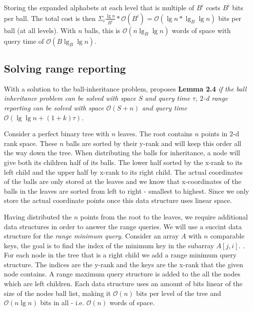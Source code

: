 Storing the expanded alphabets at each level that is multiple of $B^i$ costs $B^i$ bits per ball. The total cost is then $\Sigma_i \frac{\lg n}{B^i} * \mathcal{O}(B^i) = \mathcal{O}(\lg n * \lg_B \lg n)$ bits per ball (at all levels). With $n$ balls, this is $\mathcal{O}(n \lg_B \lg n)$ words of space with query time of $\mathcal{O}(B \lg_B \lg n)$. 


\subsection{Solving range reporting}
With a solution to the ball-inheritance problem, \citet{chanetal} proposes \textbf{Lemma 2.4} \emph{if the ball inheritance problem can be solved with space $S$ and query time $\tau$, $2$-d range reporting can be solved with space $\mathcal{O}(S+n)$ and query time $\mathcal{O}(\lg \lg n + (1+k) \tau)$.}

Consider a perfect binary tree with $n$ leaves. The root contains $n$ points in $2$-d rank space. These $n$ balls are sorted by their y-rank and will keep this order all the way down the tree. When distributing the balls for inheritance, a node will give both its children half of its balls. The lower half sorted by the x-rank to its left child and the upper half by x-rank to its right child. The actual coordinates of the balls are only stored at the leaves and we know that x-coordinates of the balls in the leaves are sorted from left to right - smallest to highest. Since we only store the actual coordinate points once this data structure uses linear space.

Having distributed the $n$ points from the root to the leaves, we require additional data structures in order to answer the range queries. We will use a succint data structure for the \emph{range minimum query}. Consider an array $A$ with $n$ comparable keys, the goal is to find the index of the minimum key in the subarray $A[j,i]$. . For each node in the tree that is a right child we add a range minimum query structure. The indices are the y-rank and the keys are the x-rank that the given node contains. A range maximum query structure is added to the all the nodes which are left children. Each data structure uses an amount of bits linear of the size of the nodes ball list, making it $\mathcal{O}(n)$ bits per level of the tree and $\mathcal{O}(n \lg n)$ bits in all - i.e. $\mathcal{O}(n)$ words of space. \\

